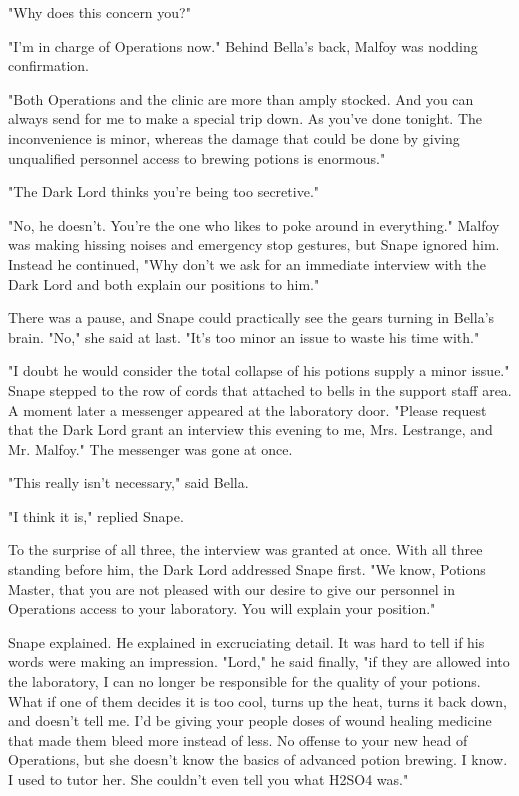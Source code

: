 \documentclass[a4paper,11pt]{article}
\begin{document}
"Why does this concern you?"

"I'm in charge of Operations now." Behind Bella's back, Malfoy was nodding confirmation.

"Both Operations and the clinic are more than amply stocked. And you can always send for me to make a special trip down. As you've done tonight. The inconvenience is minor, whereas the damage that could be done by giving unqualified personnel access to brewing potions is enormous."

"The Dark Lord thinks you're being too secretive."

"No, he doesn't. You're the one who likes to poke around in everything." Malfoy was making hissing noises and emergency stop gestures, but Snape ignored him. Instead he continued, "Why don't we ask for an immediate interview with the Dark Lord and both explain our positions to him."

There was a pause, and Snape could practically see the gears turning in Bella's brain. "No," she said at last. "It's too minor an issue to waste his time with."

"I doubt he would consider the total collapse of his potions supply a minor issue." Snape stepped to the row of cords that attached to bells in the support staff area. A moment later a messenger appeared at the laboratory door. "Please request that the Dark Lord grant an interview this evening to me, Mrs. Lestrange, and Mr. Malfoy." The messenger was gone at once.

"This really isn't necessary," said Bella.

"I think it is," replied Snape.

To the surprise of all three, the interview was granted at once. With all three standing before him, the Dark Lord addressed Snape first. "We know, Potions Master, that you are not pleased with our desire to give our personnel in Operations access to your laboratory. You will explain your position."

Snape explained. He explained in excruciating detail. It was hard to tell if his words were making an impression. "Lord," he said finally, "if they are allowed into the laboratory, I can no longer be responsible for the quality of your potions. What if one of them decides it is too cool, turns up the heat, turns it back down, and doesn't tell me. I'd be giving your people doses of wound healing medicine that made them bleed more instead of less. No offense to your new head of Operations, but she doesn't know the basics of advanced potion brewing. I know. I used to tutor her. She couldn't even tell you what H2SO4 was."
\end{document}
